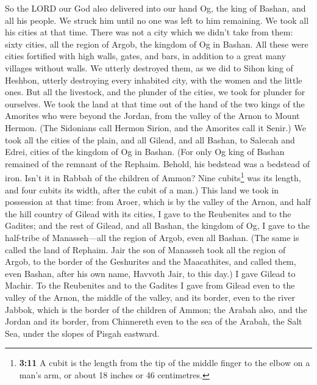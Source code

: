  So the LORD our God also delivered into our hand Og, the
king of Bashan, and all his people. We struck him until no one was left
to him remaining.  We took all his cities at that time.
There was not a city which we didn't take from them: sixty cities, all
the region of Argob, the kingdom of Og in Bashan.  All
these were cities fortified with high walls, gates, and bars, in
addition to a great many villages without walls.  We
utterly destroyed them, as we did to Sihon king of Heshbon, utterly
destroying every inhabited city, with the women and the little ones.
 But all the livestock, and the plunder of the cities, we
took for plunder for ourselves.  We took the land at that
time out of the hand of the two kings of the Amorites who were beyond
the Jordan, from the valley of the Arnon to Mount Hermon. 
(The Sidonians call Hermon Sirion, and the Amorites call it Senir.)
 We took all the cities of the plain, and all Gilead, and
all Bashan, to Salecah and Edrei, cities of the kingdom of Og in Bashan.
 (For only Og king of Bashan remained of the remnant of
the Rephaim. Behold, his bedstead was a bedstead of iron. Isn't it in
Rabbah of the children of Ammon? Nine cubits\footnote{\textbf{3:11} A
  cubit is the length from the tip of the middle finger to the elbow on
  a man's arm, or about 18 inches or 46 centimetres.} was its length,
and four cubits its width, after the cubit of a man.) 
This land we took in possession at that time: from Aroer, which is by
the valley of the Arnon, and half the hill country of Gilead with its
cities, I gave to the Reubenites and to the Gadites;  and
the rest of Gilead, and all Bashan, the kingdom of Og, I gave to the
half-tribe of Manasseh---all the region of Argob, even all Bashan. (The
same is called the land of Rephaim.  Jair the son of
Manasseh took all the region of Argob, to the border of the Geshurites
and the Maacathites, and called them, even Bashan, after his own name,
Havvoth Jair, to this day.)  I gave Gilead to Machir.
 To the Reubenites and to the Gadites I gave from Gilead
even to the valley of the Arnon, the middle of the valley, and its
border, even to the river Jabbok, which is the border of the children of
Ammon;  the Arabah also, and the Jordan and its border,
from Chinnereth even to the sea of the Arabah, the Salt Sea, under the
slopes of Pisgah eastward.

